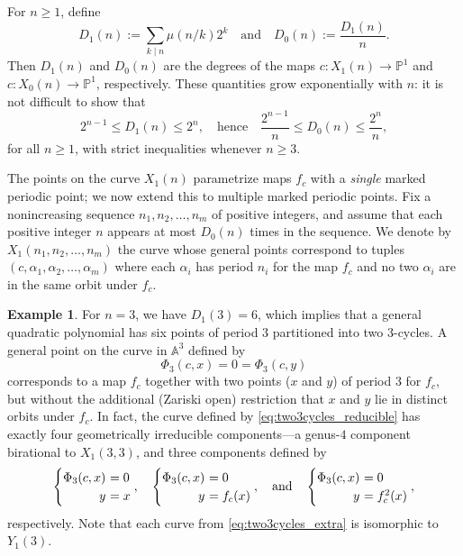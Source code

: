 \documentclass[12pt]{amsart}
\theoremstyle{definition}
\newtheorem{ex}[thm]{Example}
\newcommand{\bbA}{\mathbb{A}}
\newcommand{\bbP}{\mathbb{P}}
\numberwithin{equation}{section}
\begin{document}
For $n \ge 1$, define
    \[
        D_1(n) := \sum_{k\mid n} \mu(n/k) 2^k \quad\text{and}\quad D_0(n) := \frac{D_1(n)}n.
    \]
Then $D_1(n)$ and $D_0(n)$ are the degrees of the maps $c : X_1(n) \to \bbP^1$ and $c : X_0(n) \to \bbP^1$, respectively. These quantities grow exponentially with $n$: it is not difficult to show that
    \begin{equation}\label{eq:D1_bounds}
        2^{n-1} \le D_1(n) \le 2^n, \quad\text{hence}\quad \frac{2^{n-1}}n \le D_0(n) \le \frac{2^n}n,
    \end{equation}
for all $n\ge 1$, with strict inequalities whenever $n \ge 3$.

The points on the curve $X_1(n)$ parametrize maps $f_c$ with a \textit{single} marked periodic point; we now extend this to multiple marked periodic points. Fix a nonincreasing sequence $n_1,n_2,\ldots,n_m$ of positive integers, and assume that each positive integer $n$ appears at most $D_0(n)$ times in the sequence. We denote by $X_1(n_1,n_2,\ldots,n_m)$ the curve whose general points correspond to tuples $(c, \alpha_1,\alpha_2,\ldots,\alpha_m)$ where each $\alpha_i$ has period $n_i$ for the map $f_c$ and no two $\alpha_i$ are in the same orbit under $f_c$.

\begin{ex}\label{ex:(3,3)}
For $n = 3$, we have $D_1(3) = 6$, which implies that a general quadratic polynomial has six points of period $3$ partitioned into two $3$-cycles. A general point on the curve in $\bbA^3$ defined by
    \begin{equation}\label{eq:two3cycles_reducible}
    \Phi_3(c,x) = 0 = \Phi_3(c,y)
    \end{equation}
corresponds to a map $f_c$ together with two points ($x$ and $y$) of period $3$ for $f_c$, but without the additional (Zariski open) restriction that $x$ and $y$ lie in distinct orbits under $f_c$. In fact, the curve defined by \eqref{eq:two3cycles_reducible} has exactly four geometrically irreducible components---a genus-$4$ component birational to $X_1(3,3)$, and three components defined by
    \begin{equation}\label{eq:two3cycles_extra}
        \begin{cases}
            \Phi_3(c,x) &\!\!\!\!= 0\\
            \hfill y &\!\!\!\!= x
        \end{cases}
        ,\quad
        \begin{cases}
            \Phi_3(c,x) &\!\!\!\!= 0\\
            \hfill y &\!\!\!\!= f_c(x)
        \end{cases}
        ,\quad\text{and}\quad
        \begin{cases}
            \Phi_3(c,x) &\!\!\!\!= 0\\
            \hfill y &\!\!\!\!= f_c^2(x)
        \end{cases}
        ,
    \end{equation}
respectively. Note that each curve from \eqref{eq:two3cycles_extra} is isomorphic to $Y_1(3)$.
\end{ex}
\end{document}
